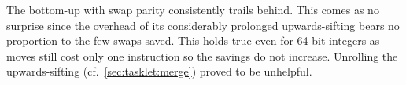 The bottom-up \HS{} with swap parity consistently trails behind.
This comes as no surprise since the overhead of its considerably prolonged upwards-sifting bears no proportion to the few swaps saved.
This holds true even for 64-bit integers as moves still cost only one instruction so the savings do not increase.
Unrolling the upwards-sifting (cf.\ \cref{sec:tasklet:merge}) proved to be unhelpful.
